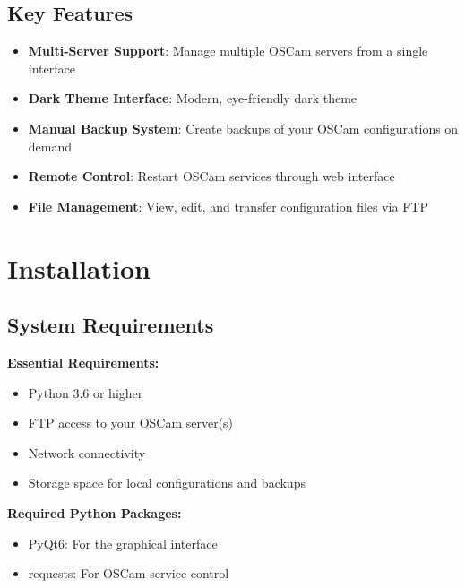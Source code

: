 \documentclass[a4paper,11pt]{report}
\begin{document}
\section{Key Features}
\begin{itemize}
    \item \textbf{Multi-Server Support}: Manage multiple OSCam servers from a single interface
    \item \textbf{Dark Theme Interface}: Modern, eye-friendly dark theme
    \item \textbf{Manual Backup System}: Create backups of your OSCam configurations on demand
    \item \textbf{Remote Control}: Restart OSCam services through web interface
    \item \textbf{File Management}: View, edit, and transfer configuration files via FTP
\end{itemize}

\chapter{Installation}

\section{System Requirements}
\begin{procedurebox}
\textbf{Essential Requirements:}
\begin{itemize}
    \item Python 3.6 or higher
    \item FTP access to your OSCam server(s)
    \item Network connectivity
    \item Storage space for local configurations and backups
\end{itemize}

\textbf{Required Python Packages:}
\begin{itemize}
    \item PyQt6: For the graphical interface
    \item requests: For OSCam service control
\end{itemize}
\end{procedurebox}
\end{document}
